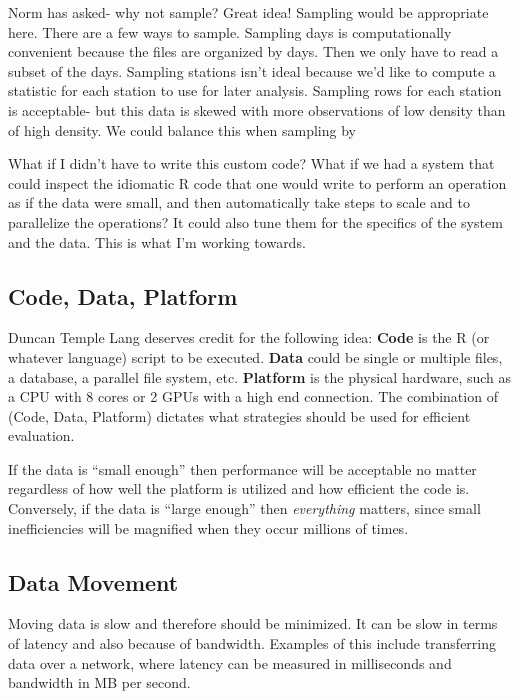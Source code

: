 \documentclass[12pt]{article}
\begin{document}
Norm has asked- why not sample? Great idea! Sampling would be appropriate
here. There are a few ways to sample. Sampling days is
computationally convenient because the files are organized by days. Then we
only have to read a subset of the days. Sampling stations isn't
ideal because we'd like to compute a statistic for each station to use for
later analysis. Sampling rows for each station is acceptable- but this data
is skewed with more observations of low density than 
of high density. We could balance this when sampling by 

What if I didn't have to write this custom code? What if we had a system
that could inspect the idiomatic R code that one would write to perform an
operation as if the data were small, and then automatically take steps to
scale and to parallelize the operations? It could also tune them for the
specifics of the system and the data. This is what I'm working towards.

\subsection{Code, Data, Platform}

Duncan Temple Lang deserves credit for the following idea:
\textbf{Code} is the R (or whatever language) script to be executed.
\textbf{Data} could be single or multiple files, a database, a parallel
file system, etc.  \textbf{Platform} is the physical hardware, such as a
CPU with 8 cores or 2 GPUs with a high end connection. The combination of
(Code, Data, Platform) dictates what strategies should be used for
efficient evaluation.

If the data is ``small enough'' then performance will be acceptable no
matter regardless of how well the platform is utilized and how efficient
the code is. Conversely, if the data is ``large enough'' then
\emph{everything} matters, since small inefficiencies will be magnified
when they occur millions of times.

\subsection{Data Movement}

Moving data is slow and therefore should be minimized. It can be slow in
terms of latency and also because of bandwidth. Examples of this include
transferring data over a network, where latency can be measured in
milliseconds and bandwidth in MB per second.
\end{document}
